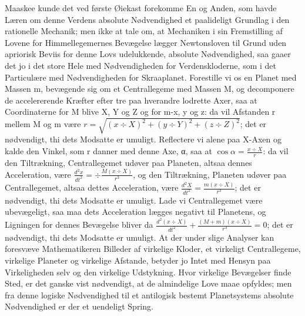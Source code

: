 \documentclass[12pt,a4paper]{book}
\begin{document}
Maaskee kunde det ved første Øiekast forekomme En og Anden, som havde
Læren om denne Verdens absolute Nødvendighed et paalideligt Grundlag i
den rationelle Mechanik; men ikke at tale om, at Mechaniken i sin
Fremstilling af Lovene for Himmellegemernes Bevægelse lægger
Newtonsloven til Grund uden apriorisk Beviis for denne Lovs udelukkende,
absolute Nødvendighed, saa gaaer det jo i det store Hele med
Nødvendigheden for Verdenskloderne, som i det Particulære med
Nødvendigheden for Skraaplanet. Forestille vi os en Planet med Massen m,
bevægende sig om et Centrallegeme med Massen M, og decomponere de
accelererende Kræfter efter tre paa hverandre lodrette Axer, saa at
Coordinaterne for M blive X, Y og Z og for m-x, y og z: da vil Afstanden
r mellem M og m være
$r = \sqrt{(x \div X)^{2} + (y \div Y)^{2} + (z \div Z)^{2}}$; det er
nødvendigt, thi dets Modsatte er umuligt. Reflectere vi alene paa
X-Axen og kalde den Vinkel, som r danner med denne Axe, α, saa at
$\cos\alpha = \frac{x \div X}{r}$: da vil den Tiltrækning,
Centrallegemet udøver paa Planeten, altsaa dennes Acceleration, være
$\frac{d^{2}x}{dt^{2}} = \div\frac{M(x \div X)}{r^{3}}$, og den
Tiltrækning, Planeten udøver paa Centrallegemet, altsaa dettes
Acceleration, være $\frac{d^{2}X}{dt^{2}} = \frac{m(x \div X)}{r^{3}}$;
det er nødvendigt, thi dets Modsatte er umuligt. Lade vi Centrallegemet
være ubevægeligt, saa maa dets Acceleration lægges negativt til
Planetens, og Ligningen for dennes Bevægelse bliver da
$\frac{d^{2}(x \div X)}{dt^{2}} + \frac{(M + m)(x \div X)}{r^{3}} = 0$;
det er nødvendigt, thi dets Modsatte er umuligt. At der under slige
Analyser kan foresvæve Mathematikeren Billeder af virkelige Kloder, et
virkeligt Centrallegeme, virkelige Planeter og virkelige Afstande,
betyder jo Intet med Hensyn paa Virkeligheden selv og den virkelige
Udstykning. Hvor virkelige Bevægelser finde Sted, er det ganske vist
nødvendigt, at de almindelige Love maae opfyldes; men fra denne logiske
Nødvendighed til et antilogisk bestemt Planetsystems absolute
Nødvendighed er der et uendeligt Spring.
\end{document}
